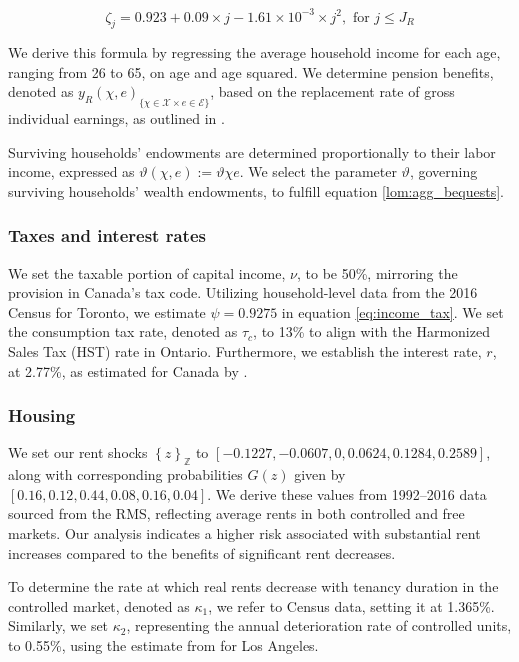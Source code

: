 \documentclass[parskip=full]{article}
\begin{document}
\begin{equation*}
\zeta_j = 0.923+0.09\times j-1.61\times 10^{-3}\times j^{2}, \mbox{ for } j\leq J_{R}
\end{equation*}

\noindent We derive this formula by regressing the average household income for each age, ranging from 26 to 65, on age and age squared. We determine pension benefits, denoted as ${y_{R}(\chi,e)}_{\{\chi \in \mathcal{X} \times e\in \mathcal{E}\}}$, based on the replacement rate of gross individual earnings, as outlined in \citet{OECD-pension}.

Surviving households' endowments are determined proportionally to their labor income, expressed as $\vartheta(\chi,e):=\vartheta \chi e$. We select the parameter $\vartheta$, governing surviving households' wealth endowments, to fulfill equation \eqref{lom:agg_bequests}.

\subsubsection{Taxes and interest rates}

We set the taxable portion of capital income, $\nu$, to be 50\%, mirroring the provision in Canada's tax code. Utilizing household-level data from the 2016 Census for Toronto, we estimate $\psi=0.9275$ in equation \eqref{eq:income_tax}. We set the consumption tax rate, denoted as $\tau_{c}$, to 13\% to align with the Harmonized Sales Tax (HST) rate in Ontario. Furthermore, we establish the interest rate, $r$, at 2.77\%, as estimated for Canada by \citet{bruneau-etal-2018}.

\subsubsection{Housing}

We set our rent shocks $\left\{z\right\}_{\mathbb{Z}}$ to $\left[-0.1227,-0.0607,0,0.0624,0.1284,0.2589\right]$, along with corresponding probabilities $G(z)$ given by $\left[0.16,0.12,0.44,0.08,0.16,0.04\right]$. We derive these values from 1992–2016 data sourced from the RMS, reflecting average rents in both controlled and free markets. Our analysis indicates a higher risk associated with substantial rent increases compared to the benefits of significant rent decreases.

To determine the rate at which real rents decrease with tenancy duration in the controlled market, denoted as $\kappa_{1}$, we refer to Census data, setting it at 1.365\%. Similarly, we set $\kappa_{2}$, representing the annual deterioration rate of controlled units, to 0.55\%, using the estimate from \citet{murray_et_al-1991} for Los Angeles.
\end{document}
